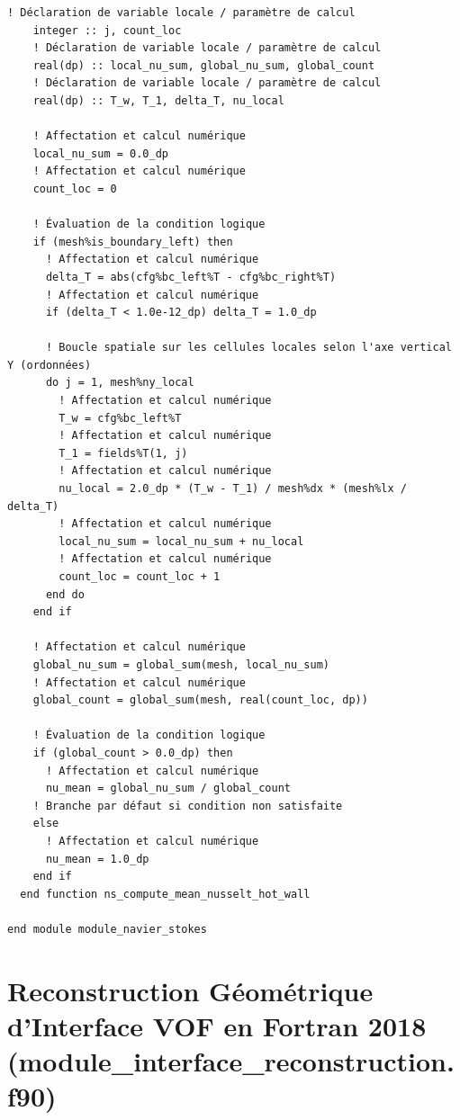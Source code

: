 \documentclass[10pt,a4paper,oneside]{book}
\begin{document}
\begin{lstlisting}[language={[95]Fortran}]
    ! Déclaration de variable locale / paramètre de calcul
    integer :: j, count_loc
    ! Déclaration de variable locale / paramètre de calcul
    real(dp) :: local_nu_sum, global_nu_sum, global_count
    ! Déclaration de variable locale / paramètre de calcul
    real(dp) :: T_w, T_1, delta_T, nu_local

    ! Affectation et calcul numérique
    local_nu_sum = 0.0_dp
    ! Affectation et calcul numérique
    count_loc = 0

    ! Évaluation de la condition logique
    if (mesh%is_boundary_left) then
      ! Affectation et calcul numérique
      delta_T = abs(cfg%bc_left%T - cfg%bc_right%T)
      ! Affectation et calcul numérique
      if (delta_T < 1.0e-12_dp) delta_T = 1.0_dp

      ! Boucle spatiale sur les cellules locales selon l'axe vertical Y (ordonnées)
      do j = 1, mesh%ny_local
        ! Affectation et calcul numérique
        T_w = cfg%bc_left%T
        ! Affectation et calcul numérique
        T_1 = fields%T(1, j)
        ! Affectation et calcul numérique
        nu_local = 2.0_dp * (T_w - T_1) / mesh%dx * (mesh%lx / delta_T)
        ! Affectation et calcul numérique
        local_nu_sum = local_nu_sum + nu_local
        ! Affectation et calcul numérique
        count_loc = count_loc + 1
      end do
    end if

    ! Affectation et calcul numérique
    global_nu_sum = global_sum(mesh, local_nu_sum)
    ! Affectation et calcul numérique
    global_count = global_sum(mesh, real(count_loc, dp))

    ! Évaluation de la condition logique
    if (global_count > 0.0_dp) then
      ! Affectation et calcul numérique
      nu_mean = global_nu_sum / global_count
    ! Branche par défaut si condition non satisfaite
    else
      ! Affectation et calcul numérique
      nu_mean = 1.0_dp
    end if
  end function ns_compute_mean_nusselt_hot_wall

end module module_navier_stokes

\end{lstlisting}

\chapter{Reconstruction Géométrique d'Interface VOF en Fortran 2018 (module_interface_reconstruction.f90)}
\end{document}
